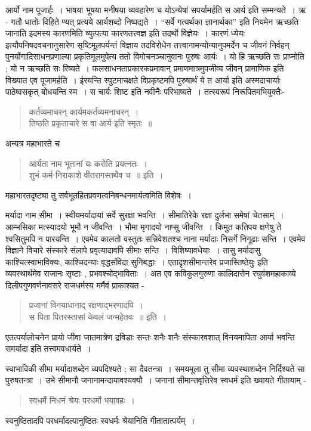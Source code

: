 {आर्यो नाम पूजार्हः~। भाषया भूषया मनीषया व्यवहारेण च योऽन्येषां सपर्यामर्हति स आर्य इति सम्मन्यते~। ऋ - गतौ धातोः विहिते ण्यत् प्रत्यये आर्यशब्दो निष्पद्यते~। “सर्वे गत्यर्थका ज्ञानार्थका” इति नियमेन ऋच्छति जानाति इदमस्य कारणमिति व्युत्पत्या कारणतत्त्वज्ञ इति तदर्थो विज्ञेयः~। कारणं ध्येयः इत्यौपनिषदवचनानुसारेण सृष्टिमूलपर्यन्तं विज्ञाय तदविरोधेन तत्त्वानामन्योन्यानुपमर्देन च जीवनं निर्वहन् पुनर्योगादिसाधनप्रणाल्या प्रकृतिमूलमुपेत्य ततो विमोचनञ्चानुवानः पुरुषः आर्यः~। यो हि ऋच्छति सः प्राप्नोति ; यो न ऋच्छति सः रिष्यते~। फलसाधनताप्रकारकप्रमावान् प्रमाणमात्रमुपजीव्य जीवन् प्रामाणिक इति विख्यात एव पूजामर्हति~। ईरयन्ति स्पुटमाचक्षते विप्रकृष्टमपि पुरुषार्थं ये त आर्या इति अस्मदाचार्याः पाठेष्वसकृत् बोधयन्ति स्म~। स चार्यः शिष्ट इति नवीनैः परिभाष्यते~। तत्स्वरूपं निरूपितमभियुक्तैः-
\begin{verse}
कर्तव्यमाचरन् कार्यमकर्तव्यमनाचरन्~। \\
तिष्ठति प्रकृताचारे स वा आर्य इति स्मृतः~॥
\end{verse}
अन्यत्र महाभारते च  
\begin{verse}
आर्यता नाम भूतानां यः करोति प्रयत्नतः~। \\
शुभं कर्म निराकाशे वीतरागस्तथैव च~॥ इति~। 
\end{verse}
महाभारतदृष्ट्या तु सर्वभूतहितप्रवणत्वनिबन्धनमार्यत्वमिति विशेषः~। 

मर्यादा नाम सीमा~। स्वीयमर्यादायां सर्वे सुरक्षा भवन्ति~। सीमातिरेके रक्षा दुर्लभा समेषां चेतसाम्~। आम्भसिका मत्स्यादयो भूमौ न जीवन्ति~। भौमा मृगादयो नाप्सु जीवन्ति~। किमुत कतिपय क्षणेषु ते श्वसितुमपि न पारयन्ति~। एवमेव कालतो वस्तुतः सन्निवेशतश्च नाना मर्यादाः निसर्गे निगूढाः सन्ति~। एवमेव विज्ञाने विचारे संस्कारे संलापे प्रवृत्यादावपि सीमाः सन्ति~। विशिष्यावधेयाः~। तासु मर्यादासु काश्चित्स्वाभाविक्यः, काश्चिदन्याः वृद्धसंविदा सुनिबद्धाः~। एतादृशसीमान्तरेव प्रजास्तिष्ठेयुः इति व्यवस्थार्थमेव राजानः सृष्टाः , प्रभवश्चोद्भाविताः~। अत एव कविकुलगुरुणा कालिदासेन रघुवंशमहाकाव्ये दिलीपगुणवर्णनावसरे राजधर्मस्य मर्मैवं प्राकाश्यत -
\begin{verse}
प्रजानां विनयाधानाद् रक्षणाद्भरणादपि~। \\ 
स पिता पितरस्तासां केवलं जन्महेतवः~॥ इति~। 
\end{verse}
एतत्पर्यालोचनेन प्रायो जीवा जातमात्रेण द्रविडाः सन्तः शनैः शनैः संस्कारवशात् विनयमापिता आर्या भवन्ति समर्यादा इति तत्त्वमवधार्यते~। 

स्वाभाविकी सीमा मर्यादाशब्देन व्यपदिश्यते ; सा दैवतन्त्रा~। समयमूला तु सीमा व्यवस्थाशब्देन निर्दिश्यते सा पुरुषतन्त्रा~।  उभे सीमानौ जनानामन्दायावश्यक्यौ~। जनानां सीमान्तवृत्तिरेव स्वधर्म इति ख्यायते गीतायाम् -
\begin{verse}
स्वधर्मे निधनं श्रेयः परधर्मो भयावहः~। 
\end{verse}
स्वनुष्ठितादपि परधर्मादल्पानुष्ठितः स्वधर्मः श्रेयानिति गीतातात्पर्यम्~। 

}

